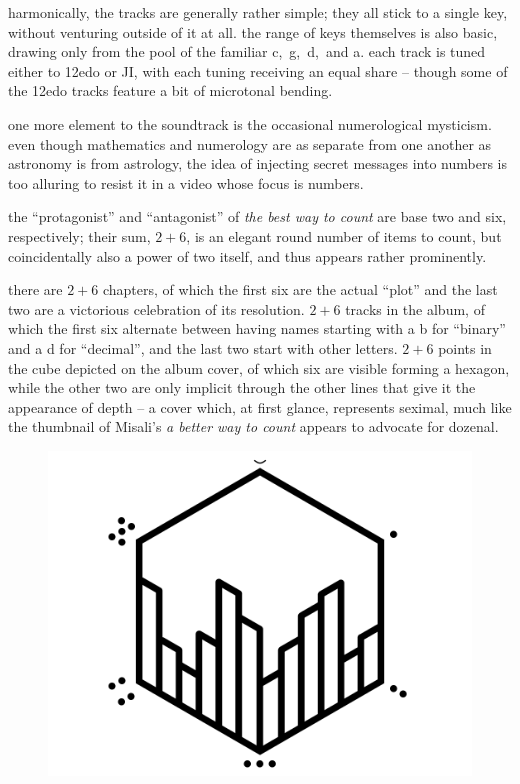 \documentclass[a4paper, 12pt]{report}
\begin{document}
harmonically, the tracks are generally rather simple; they all stick to a single key, without venturing outside of it at all. the range of keys themselves is also basic, drawing only from the pool of the familiar {\sc c},~{\sc g},~{\sc d},~and {\sc a}. each track is tuned either to 12edo or JI, with each tuning receiving an equal share -- though some of the 12edo tracks feature a bit of microtonal bending.

one more element to the soundtrack is the occasional numerological mysticism. even though mathematics and numerology are as separate from one another as astronomy is from astrology, the idea of injecting secret messages into numbers is too alluring to resist it in a video whose focus is numbers.

the ``protagonist'' and ``antagonist'' of {\it the best way to count} are base two and six, respectively; their sum, $2 + 6$, is an elegant round number of items to count, but coincidentally also a power of two itself, and thus appears rather prominently.

there are $2 + 6$ chapters, of which the first six are the actual ``plot'' and the last two are a victorious celebration of its resolution. $2 + 6$ tracks in the album, of which the first six alternate between having names starting with a {\sc b} for ``binary'' and a {\sc d} for ``decimal'', and the last two start with other letters. $2 + 6$ points in the cube depicted on the album cover, of which six are visible forming a hexagon, while the other two are only implicit through the other lines that give it the appearance of depth -- a cover which, at first glance, represents seximal, much like the thumbnail of Misali's {\it a better way to count} appears to advocate for dozenal.

\begin{figure}[H]
	\centering
	\includegraphics[scale=0.3]{cover.png}
\end{figure}
\end{document}
